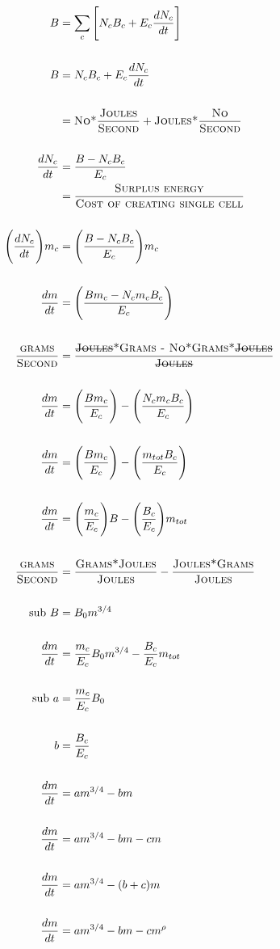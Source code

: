 \documentclass[a4paper]{article} %
\begin{document}
\begin{align*}
    B &= \sum_c \Bigg[N_{c}B_{c} + E_{c}\frac{dN_{c}}{dt}\Bigg] \\ \\
    B &= N_{c}B_{c} + E_{c}\frac{dN_{c}}{dt} \\ \\
    &= \textsc{No*}\frac{\textsc{Joules}}{\textsc{Second}} + \textsc{Joules*}\frac{\textsc{No}}{\textsc{Second}}\\ \\
    \frac{dN_{c}}{dt} &= \frac{B - N_{c}B_{c}}{E_{c}} \\
    &= \frac{\textsc{Surplus energy}}{\textsc{Cost of creating single cell}} \\ \\
    \Bigg(\frac{dN_{c}}{dt}\Bigg)m_c &= \Bigg(\frac{B - N_{c}B_{c}}{E_{c}}\Bigg)m_c \\ \\
    \frac{dm}{dt} &= \Bigg(\frac{Bm_c - N_{c}m_{c}B_{c}}{E_c}\Bigg) \\ \\
    \frac{\textsc{grams}}{\textsc{Second}} &= \frac{\textsc{\st{Joules}*Grams - No*Grams*\st{Joules}}}{\textsc{\st{Joules}}} \\ \\
    \frac{dm}{dt} &= \Bigg(\frac{Bm_c}{E_c}\Bigg) - \Bigg(\frac{N_{c}m_{c}B_{c}}{E_c}\Bigg) \\ \\
    \frac{dm}{dt} &= \Bigg(\frac{Bm_c}{E_c}\Bigg) - \Bigg(\frac{m_{tot}B_{c}}{E_c}\Bigg) \\ \\
    \frac{dm}{dt} &= \Bigg(\frac{m_c}{E_c}\Bigg)B - \Bigg(\frac{B_{c}}{E_c}\Bigg)m_{tot} \\ \\
    \frac{\textsc{grams}}{\textsc{Second}} &= \frac{\textsc{Grams*Joules}}{\textsc{Joules}} - \frac{\textsc{Joules*Grams}}{\textsc{Joules}} \\ \\
    \text{sub } B &= B_{0}m^{3/4}  \\ \\
    \frac{dm}{dt} &= \frac{m_c}{E_c}B_{0}m^{3/4} - \frac{B_{c}}{E_c}m_{tot} \\ \\
    \text{sub } a &= \frac{m_c}{E_c}B_{0}  \\ \\
    b &= \frac{B_{c}}{E_c} \\ \\
    \frac{dm}{dt} &= am^{3/4} - bm \\ \\
    \frac{dm}{dt} &= am^{3/4} - bm - cm \\ \\
    \frac{dm}{dt} &= am^{3/4} - (b+c)m \\ \\
    \frac{dm}{dt} &= am^{3/4} - bm - cm^{\rho} \\ \\
\end{align*}
\end{document}

